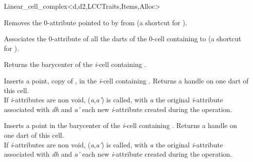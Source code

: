\begin{ccRefClass}{Linear_cell_complex<d,d2,LCCTraits,Items,Alloc>}


{Removes the 0-attribute pointed to by  from 
  (a shortcut for ).
}

{Associates the 0-attribute of all the darts of the 0-cell 
  containing  to 
  (a shortcut for ).
}


{Returns the barycenter of the \emph{i}-cell containing .
}

{Inserts a point, copy of , in the \emph{i}-cell containing .
  Returns a handle on one dart of this cell.  
  \\
    If \emph{i}-attributes are non void, 
    (\emph{a},\emph{a'}) is called, 
    with \emph{a} the original \emph{i}-attribute associated
    with \emph{dh} and \emph{a'} each new \emph{i}-attribute created during the operation.
}

{Inserts a point in the barycenter of the \emph{i}-cell containing .
  Returns a handle on one dart of this cell.  
  \\
    If \emph{i}-attributes are non void, 
    (\emph{a},\emph{a'}) is called,
    with \emph{a} the original \emph{i}-attribute associated
    with \emph{dh} and \emph{a'} each new \emph{i}-attribute created during the operation.
}


\end{ccRefClass}
